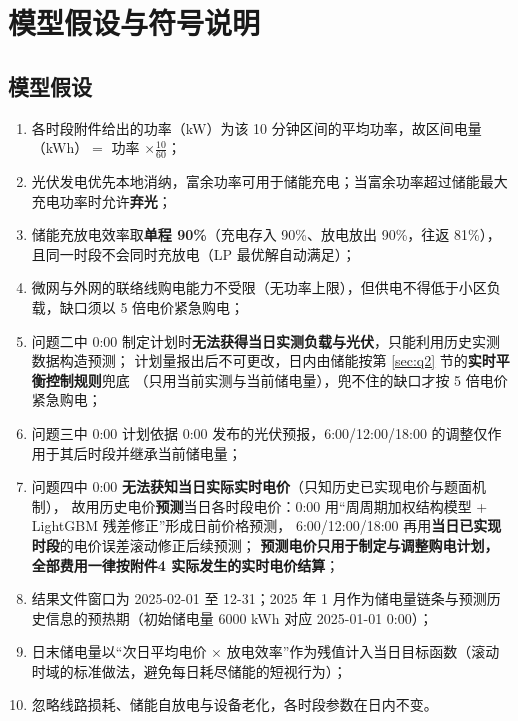 \section{模型假设与符号说明}
\label{sec:assume}

\subsection{模型假设}

\begin{enumerate}[label=\textbf{假设\arabic*.}, leftmargin=4.2em, itemsep=2pt]
\item 各时段附件给出的功率（kW\nobreak）为该 10 分钟区间的平均功率\nobreak，故区间电量（kWh\nobreak）$=$ 功率 $\times \frac{10}{60}$\nobreak；
\item 光伏发电优先本地消纳\nobreak，富余功率可用于储能充电\nobreak；当富余功率超过储能最大充电功率时允许\textbf{弃光}\nobreak；
\item 储能充放电效率取\textbf{单程 90\%}（充电存入 90\%\nobreak、放电放出 90\%\nobreak，往返 81\%\nobreak）\nobreak，且同一时段不会同时充放电（LP 最优解自动满足\nobreak）\nobreak；
\item 微网与外网的联络线购电能力不受限（无功率上限\nobreak）\nobreak，但供电不得低于小区负载\nobreak，缺口须以 5 倍电价紧急购电\nobreak；
\item 问题二中 0:00 制定计划时\textbf{无法获得当日实测负载与光伏}\nobreak，只能利用历史实测数据构造预测\nobreak；
计划量报出后不可更改\nobreak，日内由储能按第 \ref{sec:q2} 节的\textbf{实时平衡控制规则}兜底
（只用当前实测与当前储电量\nobreak）\nobreak，兜不住的缺口才按 5 倍电价紧急购电\nobreak；
\item 问题三中 0:00 计划依据 0:00 发布的光伏预报\nobreak，6:00/12:00/18:00 的调整仅作用于其后时段并继承当前储电量\nobreak；
\item 问题四中 0:00 \textbf{无法获知当日实际实时电价}（只知历史已实现电价与题面机制\nobreak）\nobreak，
故用历史电价\textbf{预测}当日各时段电价：0:00 用“周周期加权结构模型 + LightGBM 残差修正”形成日前价格预测\nobreak，
6:00/12:00/18:00 再用\textbf{当日已实现时段}的电价误差滚动修正后续预测\nobreak；
\textbf{预测电价只用于制定与调整购电计划\nobreak，全部费用一律按附件4 实际发生的实时电价结算}\nobreak；
\item 结果文件窗口为 2025-02-01 至 12-31\nobreak；2025 年 1 月作为储电量链条与预测历史信息的预热期（初始储电量 6000 kWh 对应 2025-01-01 0:00\nobreak）\nobreak；
\item 日末储电量以“次日平均电价 $\times$ 放电效率\nobreak”作为残值计入当日目标函数（滚动时域的标准做法\nobreak，避免每日耗尽储能的短视行为\nobreak）\nobreak；
\item 忽略线路损耗\nobreak、储能自放电与设备老化\nobreak，各时段参数在日内不变\nobreak。
\end{enumerate}

